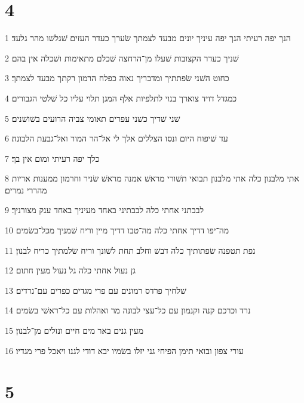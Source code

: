 \chapter{4}

\par 1 הנך יפה רעיתי הנך יפה עיניך יונים מבעד לצמתך שׂערך כעדר העזים שׁגלשׁו מהר גלעד׃
\par 2 שׁניך כעדר הקצובות שׁעלו מן־הרחצה שׁכלם מתאימות ושׁכלה אין בהם׃
\par 3 כחוט השׁני שׂפתתיך ומדבריך נאוה כפלח הרמון רקתך מבעד לצמתך׃
\par 4 כמגדל דויד צוארך בנוי לתלפיות אלף המגן תלוי עליו כל שׁלטי הגבורים׃
\par 5 שׁני שׁדיך כשׁני עפרים תאומי צביה הרועים בשׁושׁנים׃
\par 6 עד שׁיפוח היום ונסו הצללים אלך לי אל־הר המור ואל־גבעת הלבונה׃
\par 7 כלך יפה רעיתי ומום אין בך׃
\par 8 אתי מלבנון כלה אתי מלבנון תבואי תשׁורי מראשׁ אמנה מראשׁ שׂניר וחרמון ממענות אריות מהררי נמרים׃
\par 9 לבבתני אחתי כלה לבבתיני באחד מעיניך באחד ענק מצורניך׃
\par 10 מה־יפו דדיך אחתי כלה מה־טבו דדיך מיין וריח שׁמניך מכל־בשׂמים׃
\par 11 נפת תטפנה שׂפתותיך כלה דבשׁ וחלב תחת לשׁונך וריח שׂלמתיך כריח לבנון׃
\par 12 גן נעול אחתי כלה גל נעול מעין חתום׃
\par 13 שׁלחיך פרדס רמונים עם פרי מגדים כפרים עם־נרדים׃
\par 14 נרד וכרכם קנה וקנמון עם כל־עצי לבונה מר ואהלות עם כל־ראשׁי בשׂמים׃
\par 15 מעין גנים באר מים חיים ונזלים מן־לבנון׃
\par 16 עורי צפון ובואי תימן הפיחי גני יזלו בשׂמיו יבא דודי לגנו ויאכל פרי מגדיו׃

\chapter{5}

